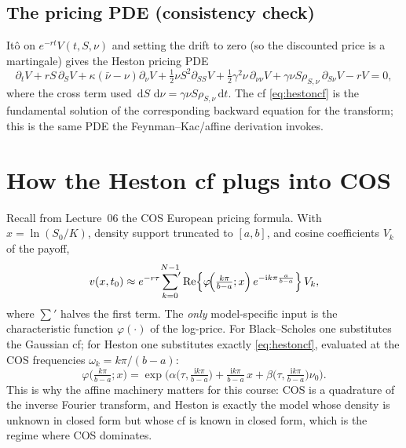 \documentclass[11pt]{article}
\newcommand{\ii}{\mathrm{i}}
\newcommand{\dd}{\,\mathrm{d}}
\newcommand{\ch}{\varphi}
\begin{document}
\subsection{The pricing PDE (consistency check)}

It\^o on $e^{-rt}V(t,S,\nu)$ and setting the drift to zero (so the discounted price is a
martingale) gives the Heston pricing PDE
\begin{equation}
\partial_t V + rS\,\partial_S V + \kappa(\bar\nu-\nu)\partial_\nu V
+ \tfrac12\nu S^2 \partial_{SS}V + \tfrac12\gamma^2\nu\,\partial_{\nu\nu}V
+ \gamma\nu S\rho_{S,\nu}\,\partial_{S\nu}V - rV = 0,
\end{equation}
where the cross term used $\dd S\,\dd\nu = \gamma\nu S\rho_{S,\nu}\dd t$. The cf
\eqref{eq:hestoncf} is the fundamental solution of the corresponding backward equation for
the transform; this is the same PDE the Feynman--Kac/affine derivation invokes.

\section{How the Heston cf plugs into COS}

Recall from Lecture~06 the COS European pricing formula. With $x=\ln(S_0/K)$, density
support truncated to $[a,b]$, and cosine coefficients $V_k$ of the payoff,
\begin{equation}
v(x,t_0) \approx e^{-r\tau}\sideset{}{'}\sum_{k=0}^{N-1}
\operatorname{Re}\!\Big\{\ch\!\Big(\tfrac{k\pi}{b-a};x\Big)\,
e^{-\ii k\pi\frac{a}{b-a}}\Big\}\,V_k,
\label{eq:cos}
\end{equation}
where ${\sum}'$ halves the first term. The \emph{only} model-specific input is the
characteristic function $\ch(\cdot)$ of the log-price. For Black--Scholes one substitutes
the Gaussian cf; for Heston one substitutes exactly \eqref{eq:hestoncf}, evaluated at the
COS frequencies $\omega_k = k\pi/(b-a)$:
\begin{equation}
\ch\!\Big(\tfrac{k\pi}{b-a};x\Big)
= \exp\!\Big(\alpha\big(\tau,\tfrac{\ii k\pi}{b-a}\big)
+ \tfrac{\ii k\pi}{b-a}\,x
+ \beta\big(\tau,\tfrac{\ii k\pi}{b-a}\big)\nu_0\Big).
\end{equation}
This is why the affine machinery matters for this course: COS is a quadrature of the
inverse Fourier transform, and Heston is exactly the model whose density is unknown in
closed form but whose cf is known in closed form, which is the regime where COS dominates.
\end{document}
